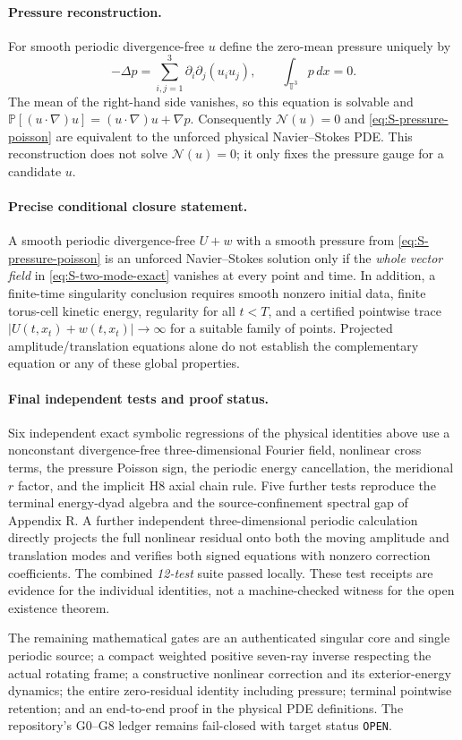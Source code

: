 \paragraph{Pressure reconstruction.}
For smooth periodic divergence-free $u$ define the zero-mean
pressure uniquely by
\begin{equation}\label{eq:S-pressure-poisson}
 -\Delta p=\sum_{i,j=1}^{3}\partial_i\partial_j(u_i u_j),
 \qquad\int_{\mathbb T^3}p\,dx=0.
\end{equation}
The mean of the right-hand side vanishes, so this equation is
solvable and $\mathbb P[(u\cdot\nabla)u]
=(u\cdot\nabla)u+\nabla p$.
Consequently $\mathcal N(u)=0$ and \eqref{eq:S-pressure-poisson}
are equivalent to the unforced physical Navier--Stokes PDE.
This reconstruction does not solve $\mathcal N(u)=0$;
it only fixes the pressure gauge for a candidate $u$.

\paragraph{Precise conditional closure statement.}
A smooth periodic divergence-free $U+w$ with a smooth pressure
from \eqref{eq:S-pressure-poisson} is an unforced Navier--Stokes
solution only if the \emph{whole vector field} in
\eqref{eq:S-two-mode-exact} vanishes at every point and time.
In addition, a finite-time singularity conclusion requires
smooth nonzero initial data, finite torus-cell kinetic energy,
regularity for all $t<T$, and a certified pointwise trace
$|U(t,x_t)+w(t,x_t)|\to\infty$ for a suitable family of points.
Projected amplitude/translation equations alone do not establish
the complementary equation or any of these global properties.

\paragraph{Final independent tests and proof status.}
Six independent exact symbolic regressions of the physical identities
above use a nonconstant divergence-free three-dimensional Fourier
field, nonlinear cross terms, the pressure Poisson sign, the
periodic energy cancellation, the meridional $r$ factor, and
the implicit H8 axial chain rule. Five further tests reproduce
the terminal energy-dyad algebra and the source-confinement
spectral gap of Appendix R. A further independent three-dimensional
periodic calculation directly projects the full nonlinear residual
onto both the moving amplitude and translation modes and verifies
both signed equations with nonzero correction coefficients.
The combined \emph{12-test} suite passed locally. These test receipts are evidence for the
individual identities, not a machine-checked witness for the open
existence theorem.

The remaining mathematical gates are an authenticated singular
core and single periodic source; a compact weighted positive
seven-ray inverse respecting the actual rotating frame; a
constructive nonlinear correction and its exterior-energy
dynamics; the entire zero-residual identity including pressure;
terminal pointwise retention; and an end-to-end proof in the
physical PDE definitions. The repository's G0--G8 ledger remains
fail-closed with target status \texttt{OPEN}.
